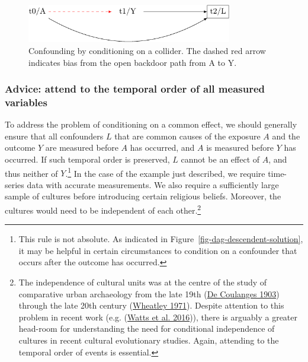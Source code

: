 \documentclass[
  singlecolumn]{article}
\begin{document}
\begin{figure}

{\centering \includegraphics[width=0.8\textwidth,height=\textheight]{causal-dags_files/figure-pdf/fig-dag-common-effect-1.pdf}

}

\caption{\label{fig-dag-common-effect}Confounding by conditioning on a
collider. The dashed red arrow indicates bias from the open backdoor
path from A to Y.}

\end{figure}

\hypertarget{advice-attend-to-the-temporal-order-of-all-measured-variables-1}{%
\subsubsection{Advice: attend to the temporal order of all measured
variables}\label{advice-attend-to-the-temporal-order-of-all-measured-variables-1}}

To address the problem of conditioning on a common effect, we should
generally ensure that all confounders \(L\) that are common causes of
the exposure \(A\) and the outcome \(Y\) are measured before \(A\) has
occurred, and \(A\) is measured before \(Y\) has occurred. If such
temporal order is preserved, \(L\) cannot be an effect of \(A\), and
thus neither of \(Y\).\footnote{This rule is not absolute. As indicated
  in Figure~\ref{fig-dag-descendent-solution}, it may be helpful in
  certain circumstances to condition on a confounder that occurs after
  the outcome has occurred.} In the case of the example just described,
we require time-series data with accurate measurements. We also require
a sufficiently large sample of cultures before introducing certain
religious beliefs. Moreover, the cultures would need to be independent
of each other.\footnote{The independence of cultural units was at the
  centre of the study of comparative urban archaeology from the late
  19th (\protect\hyperlink{ref-decoulanges1903}{De Coulanges 1903})
  through the late 20th century
  (\protect\hyperlink{ref-wheatley1971}{Wheatley 1971}). Despite
  attention to this problem in recent work (e.g.
  (\protect\hyperlink{ref-watts2016}{Watts et al. 2016})), there is
  arguably a greater head-room for understanding the need for
  conditional independence of cultures in recent cultural evolutionary
  studies. Again, attending to the temporal order of events is
  essential.}
\end{document}
